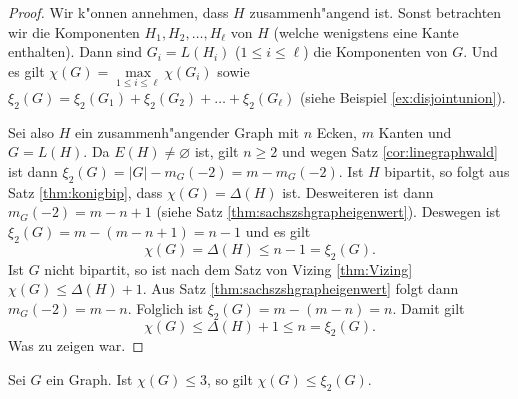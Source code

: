 \begin{proof}
  Wir k"onnen annehmen, dass $H$ zusammenh"angend ist. Sonst betrachten wir die Komponenten $H_1,H_2,\dots,H_\ell$ von $H$ (welche wenigstens eine Kante enthalten). Dann sind $G_i= L(H_i)$ ($1\leq i \leq \ell$) die Komponenten von $G$. Und es gilt $\chi(G) = \max\limits_{1 \leq i \leq \ell} \chi(G_i)$ sowie $\xi_{2}(G) = \xi_{2}(G_1) + \xi_{2}(G_2) + \dots + \xi_{2}(G_\ell)$ (siehe Beispiel \ref{ex:disjointunion}). 

Sei also $H$ ein zusammenh"angender Graph mit $n$ Ecken, $m$ Kanten und $G = L(H)$. Da $E(H) \neq \varnothing$ ist, gilt $n \geq 2$ und wegen Satz \ref{cor:linegraphwald} ist dann $\xi_{2}(G) = |G| - m_G(-2) = m - m_G(-2)$. Ist $H$ bipartit, so folgt aus Satz \ref{thm:konigbip}, dass $\chi(G) = \Delta(H)$ ist.  
  Desweiteren ist dann $m_G(-2) = m-n+1$ (siehe Satz \ref{thm:sachszshgrapheigenwert}). Deswegen ist $\xi_{2}(G) = m - (m-n+1) = n-1$ und es gilt
  $$\chi(G) = \Delta(H) \leq n-1  = \xi_{2}(G).$$
  Ist $G$ nicht bipartit, so ist nach dem Satz von Vizing \ref{thm:Vizing} $\chi(G) \leq \Delta(H) +1$. Aus Satz \ref{thm:sachszshgrapheigenwert} folgt dann $m_G(-2) = m-n$. Folglich ist $\xi_{2}(G) = m - (m-n) = n$. Damit gilt
  $$\chi(G) \leq \Delta(H) +1 \leq n = \xi_{2}(G).$$
  Was zu zeigen war.
\end{proof}
\begin{theorem}
  Sei $G$ ein Graph. Ist $\chi(G) \leq 3$, so gilt $\chi(G) \leq \xi_{2}(G)$.
  \label{thm:chiklein}
\end{theorem}

